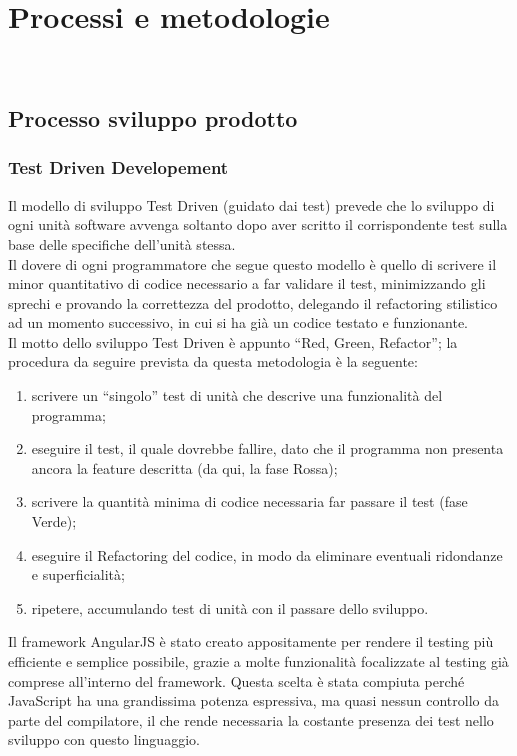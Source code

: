 
\chapter{Processi e metodologie}
\label{cap:processi-metodologie}

\\

\section{Processo sviluppo prodotto}

\subsection{Test Driven Developement}
Il modello di sviluppo Test Driven (guidato dai test) prevede che lo sviluppo di ogni unità software avvenga soltanto dopo aver scritto il corrispondente test sulla base delle specifiche dell’unità stessa.\\
Il dovere di ogni programmatore che segue questo modello è quello di scrivere il minor quantitativo di codice necessario a far validare il test, minimizzando gli sprechi e provando la correttezza del prodotto, delegando il refactoring stilistico ad un momento successivo, in cui si ha già un codice testato e funzionante.\\
Il motto dello sviluppo Test Driven è appunto “Red, Green, Refactor”; la procedura da seguire prevista da questa metodologia è la seguente:
\begin{enumerate}
	\item scrivere un “singolo” test di unità che descrive una funzionalità del programma;
	\item eseguire il test, il quale dovrebbe fallire, dato che il programma non presenta ancora la feature descritta (da qui, la fase Rossa);
	\item scrivere la quantità minima di codice necessaria far passare il test (fase Verde);
	\item eseguire il Refactoring del codice, in modo da eliminare eventuali ridondanze e superficialità;
	\item ripetere, accumulando test di unità con il passare dello sviluppo.
\end{enumerate}
Il framework AngularJS è stato creato appositamente per rendere il testing più efficiente e semplice possibile, grazie a molte funzionalità focalizzate al testing già comprese all’interno del framework. Questa scelta è stata compiuta perché JavaScript ha una grandissima potenza espressiva, ma quasi nessun controllo da parte del compilatore, il che rende necessaria la costante presenza dei test nello sviluppo con questo linguaggio.
